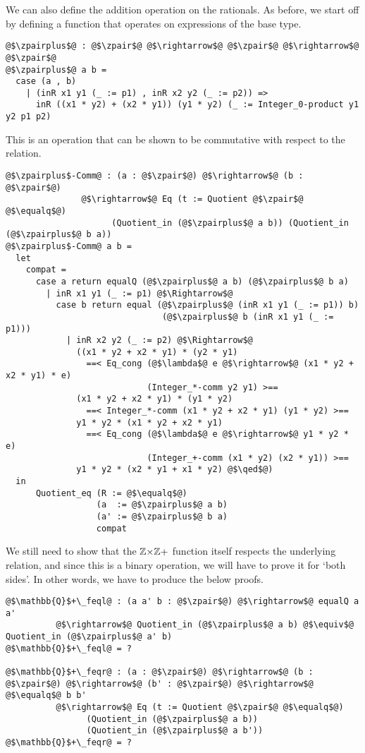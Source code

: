 \documentclass[12pt,twoside,maitrise]{dms}
\theoremstyle{definition}
\numberwithin{equation}{section}
\numberwithin{table}{chapter}
\numberwithin{figure}{chapter}
\renewcommand\qed{\blacksquare}
\begin{document}
We can also define the addition operation on the rationals. As before, we start
off by defining a function that operates on expressions of the base type.

\begin{verbatim}
@$\zpairplus$@ : @$\zpair$@ @$\rightarrow$@ @$\zpair$@ @$\rightarrow$@ @$\zpair$@
@$\zpairplus$@ a b =
  case (a , b)
    | (inR x1 y1 (_ := p1) , inR x2 y2 (_ := p2)) =>
      inR ((x1 * y2) + (x2 * y1)) (y1 * y2) (_ := Integer_0-product y1 y2 p1 p2)
\end{verbatim}

This is an operation that can be shown to be commutative with respect to the
relation.

\begin{verbatim}
@$\zpairplus$-Comm@ : (a : @$\zpair$@) @$\rightarrow$@ (b : @$\zpair$@)
               @$\rightarrow$@ Eq (t := Quotient @$\zpair$@ @$\equalq$@)
                     (Quotient_in (@$\zpairplus$@ a b)) (Quotient_in (@$\zpairplus$@ b a))
@$\zpairplus$-Comm@ a b =
  let
    compat =
      case a return equalQ (@$\zpairplus$@ a b) (@$\zpairplus$@ b a)
        | inR x1 y1 (_ := p1) @$\Rightarrow$@
          case b return equal (@$\zpairplus$@ (inR x1 y1 (_ := p1)) b)
                               (@$\zpairplus$@ b (inR x1 y1 (_ := p1)))
            | inR x2 y2 (_ := p2) @$\Rightarrow$@
              ((x1 * y2 + x2 * y1) * (y2 * y1)
                ==< Eq_cong (@$\lambda$@ e @$\rightarrow$@ (x1 * y2 + x2 * y1) * e)
                            (Integer_*-comm y2 y1) >==
              (x1 * y2 + x2 * y1) * (y1 * y2)
                ==< Integer_*-comm (x1 * y2 + x2 * y1) (y1 * y2) >==
              y1 * y2 * (x1 * y2 + x2 * y1)
                ==< Eq_cong (@$\lambda$@ e @$\rightarrow$@ y1 * y2 * e)
                            (Integer_+-comm (x1 * y2) (x2 * y1)) >==
              y1 * y2 * (x2 * y1 + x1 * y2) @$\qed$@)
  in
      Quotient_eq (R := @$\equalq$@)
                  (a  := @$\zpairplus$@ a b)
                  (a' := @$\zpairplus$@ b a)
                  compat
\end{verbatim}

We still need to show that the $\mathbb{Z}{\times}\mathbb{Z}+$ function itself respects the
underlying relation, and since this is a binary operation, we will have to prove
it for `both sides'. In other words, we have to produce the below proofs.

\begin{verbatim}
@$\mathbb{Q}$+\_feql@ : (a a' b : @$\zpair$@) @$\rightarrow$@ equalQ a a'
          @$\rightarrow$@ Quotient_in (@$\zpairplus$@ a b) @$\equiv$@ Quotient_in (@$\zpairplus$@ a' b)
@$\mathbb{Q}$+\_feql@ = ?

@$\mathbb{Q}$+\_feqr@ : (a : @$\zpair$@) @$\rightarrow$@ (b : @$\zpair$@) @$\rightarrow$@ (b' : @$\zpair$@) @$\rightarrow$@ @$\equalq$@ b b'
          @$\rightarrow$@ Eq (t := Quotient @$\zpair$@ @$\equalq$@)
                (Quotient_in (@$\zpairplus$@ a b))
                (Quotient_in (@$\zpairplus$@ a b'))
@$\mathbb{Q}$+\_feqr@ = ?
\end{verbatim}
\end{document}
